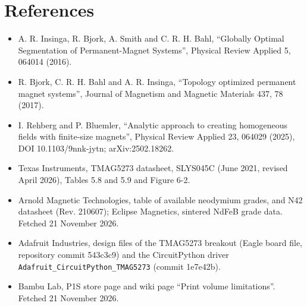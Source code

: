\documentclass[11pt,a4paper]{article}
\begin{document}
\section*{References}
\begin{itemize}
\item{} A. R. Insinga, R. Bjork, A. Smith and C. R. H. Bahl, ``Globally Optimal Segmentation of Permanent-Magnet Systems'', Physical Review Applied 5, 064014 (2016).
\item{} R. Bjork, C. R. H. Bahl and A. R. Insinga, ``Topology optimized permanent magnet systems'', Journal of Magnetism and Magnetic Materials 437, 78 (2017).
\item{} I. Rehberg and P. Bluemler, ``Analytic approach to creating homogeneous fields with finite-size magnets'', Physical Review Applied 23, 064029 (2025), DOI 10.1103/9nnk-jytn; arXiv:2502.18262.
\item{} Texas Instruments, TMAG5273 datasheet, SLYS045C (June 2021, revised April 2026), Tables 5.8 and 5.9 and Figure 6-2.
\item{} Arnold Magnetic Technologies, table of available neodymium grades, and N42 datasheet (Rev. 210607); Eclipse Magnetics, sintered NdFeB grade data. Fetched 21 November 2026.
\item{} Adafruit Industries, design files of the TMAG5273 breakout (Eagle board file, repository commit 543c3c9) and the CircuitPython driver \texttt{Adafruit\_CircuitPython\_TMAG5273} (commit 1e7e42b).
\item{} Bambu Lab, P1S store page and wiki page ``Print volume limitations''. Fetched 21 November 2026.
\end{itemize}
\end{document}
